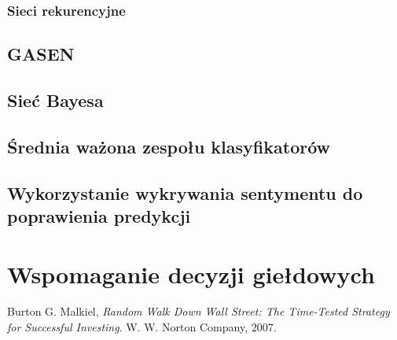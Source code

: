 \documentclass[a4paper, twoside, 11pt, openright]{article}
\begin{document}
\subsubsection{Sieci rekurencyjne}

\subsection{GASEN}

\subsection{Sieć Bayesa}

\subsection{Średnia ważona zespołu klasyfikatorów}

\subsection{Wykorzystanie wykrywania sentymentu do poprawienia predykcji}

\section{Wspomaganie decyzji giełdowych}


\newpage

\renewcommand{\refname}{Bibliografia}
\begin{thebibliography}{9}
  Burton G. Malkiel,
  \textit{Random Walk Down Wall Street: The Time-Tested Strategy for Successful Investing}.
  W. W. Norton Company,
  2007.


\end{thebibliography}
\end{document}
